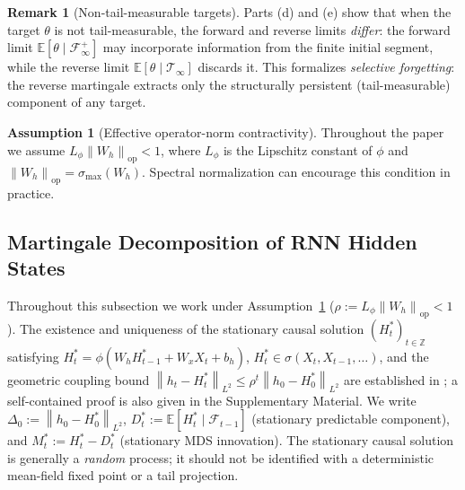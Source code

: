 \documentclass[bj,authoryear]{imsart}
\theoremstyle{plain}
\theoremstyle{definition}
\newtheorem{remark}[theorem]{Remark}
\newtheorem{assumption}[theorem]{Assumption}
\newcommand{\E}{\mathbb{E}}
\newcommand{\F}{\mathcal{F}}
\newcommand{\Tsig}{\mathcal{T}_\infty}
\newcommand{\norm}[1]{\left\lVert #1 \right\rVert}
\newcommand{\given}{\mid}
\begin{document}
\begin{remark}[Non-tail-measurable targets]
\label{rem:nontail}
  Parts (d) and (e) show that when the target $\theta$ is not tail-measurable,
  the forward and reverse limits \emph{differ}: the forward limit
  $\E[\theta\given\F_\infty^+]$ may incorporate information from the finite
  initial segment, while the reverse limit $\E[\theta\given\Tsig]$ discards it.
  This formalizes \emph{selective forgetting}: the reverse martingale extracts
  only the structurally persistent (tail-measurable) component of any target.
\end{remark}


\begin{assumption}[Effective operator-norm contractivity]
\label{ass:spectral}
  Throughout the paper we assume $L_\phi\norm{W_h}_{\mathrm{op}}<1$,
  where $L_\phi$ is the Lipschitz constant of $\phi$ and
  $\norm{W_h}_{\mathrm{op}}=\sigma_{\max}(W_h)$.
  Spectral normalization \citep{miyato2018spectral} can encourage this
  condition in practice.
\end{assumption}

\subsection{Martingale Decomposition of RNN Hidden States}
\label{sec:rnn-decomp}

Throughout this subsection we work under Assumption~\ref{ass:spectral}
($\rho:=L_\phi\norm{W_h}_{\mathrm{op}}<1$).
The existence and uniqueness of the stationary causal solution
$(H_t^*)_{t\in\mathbb{Z}}$ satisfying
$H_t^*=\phi(W_hH_{t-1}^*+W_xX_t+b_h)$,
$H_t^*\in\sigma(X_t,X_{t-1},\ldots)$,
and the geometric coupling bound
$\norm{h_t-H_t^*}_{L^2}\leq\rho^t\norm{h_0-H_0^*}_{L^2}$
are established in \citet{chang2026jrssb};
a self-contained proof is also given in
the Supplementary Material.
We write $\Delta_0:=\norm{h_0-H_0^*}_{L^2}$,
$D_t^*:=\E[H_t^*\given\F_{t-1}]$ (stationary predictable component),
and $M_t^*:=H_t^*-D_t^*$ (stationary MDS innovation).
The stationary causal solution is generally a \emph{random} process;
it should not be identified with a deterministic mean-field fixed point
or a tail projection.
\end{document}
